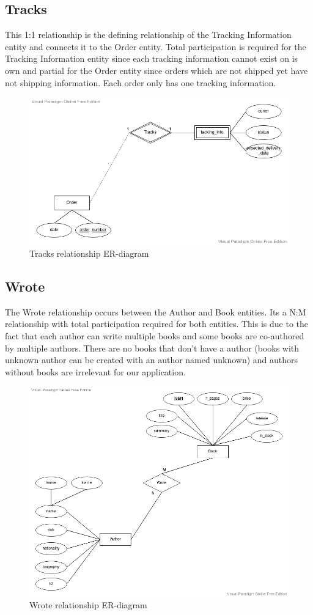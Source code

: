 \documentclass[fleqn]{scrreprt}
\begin{document}
\subsection{Tracks}
This 1:1 relationship is the defining relationship of the Tracking Information
entity and connects it to the Order entity. Total participation is required for
the Tracking Information entity since each tracking information cannot exist on
is own and partial for the Order entity since orders which are not shipped yet
have not shipping information. Each order only has one tracking information.
\begin{figure}[h]\centering
    \includegraphics[width=.8\columnwidth]{er-diagram-project-Tracks.vpd.png}
    \caption{Tracks relationship ER-diagram}\label{fig:ert}
\end{figure}

\subsection{Wrote}
The Wrote relationship occurs between the Author and Book entities. Its a N:M
relationship with total participation required for both entities. This is due to
the fact that each author can write multiple books and some books are co-authored
by multiple authors. There are no books that don't have a author (books with
unknown author can be created with an author named unknown) and authors without
books are irrelevant for our application.
\begin{figure}[ht]\centering
    \includegraphics[width=.8\columnwidth]{er-diagram-project-Wrote.vpd.png}
    \caption{Wrote relationship ER-diagram}\label{fig:erw}
\end{figure}
\newpage
\end{document}
